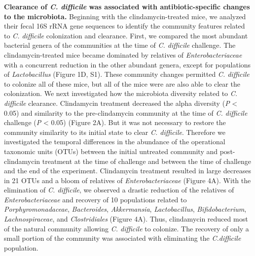 \documentclass[11pt,]{article}
\begin{document}
\textbf{Clearance of \emph{C. difficile} was associated with
antibiotic-specific changes to the microbiota.} Beginning with the
clindamycin-treated mice, we analyzed their fecal 16S rRNA gene
sequences to identify the community features related to \emph{C.
difficile} colonization and clearance. First, we compared the most
abundant bacterial genera of the communities at the time of \emph{C.
difficile} challenge. The clindamycin-treated mice became dominated by
relatives of \emph{Enterobacteriaceae} with a concurrent reduction in
the other abundant genera, except for populations of
\emph{Lactobacillus} (Figure 1D, S1). These community changes permitted
\emph{C. difficile} to colonize all of these mice, but all of the mice
were are also able to clear the colonization. We next investigated how
the microbiota diversity related to \emph{C. difficile} clearance.
Clindamycin treatment decreased the alpha diversity (\emph{P}
\textless{} 0.05) and similarity to the pre-clindamycin community at the
time of \emph{C. difficile} challenge (\emph{P} \textless{} 0.05)
(Figure 2A). But it was not necessary to restore the community
similarity to its initial state to clear \emph{C. difficile}. Therefore
we investigated the temporal differences in the abundance of the
operational taxonomic units (OTUs) between the initial untreated
community and post-clindamycin treatment at the time of challenge and
between the time of challenge and the end of the experiment. Clindamycin
treatment resulted in large decreases in 21 OTUs and a bloom of
relatives of \emph{Enterobacteriaceae} (Figure 4A). With the elimination
of \emph{C. difficile}, we observed a drastic reduction of the relatives
of \emph{Enterobacteriaceae} and recovery of 10 populations related to
\emph{Porphyromonadaceae}, \emph{Bacteroides}, \emph{Akkermansia},
\emph{Lactobacillus}, \emph{Bifidobacterium}, \emph{Lachnospiraceae},
and \emph{Clostridiales} (Figure 4A). Thus, clindamycin reduced most of
the natural community allowing \emph{C. difficile} to colonize. The
recovery of only a small portion of the community was associated with
eliminating the \emph{C.difficile} population.
\end{document}
